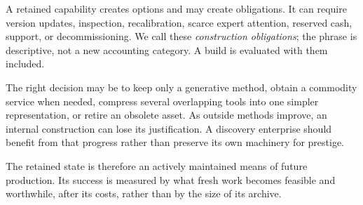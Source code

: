 A retained capability creates options and may create obligations. It can require version updates, inspection, recalibration, scarce expert attention, reserved cash, support, or decommissioning. We call these \emph{construction obligations}; the phrase is descriptive, not a new accounting category. A build is evaluated with them included.

The right decision may be to keep only a generative method, obtain a commodity service when needed, compress several overlapping tools into one simpler representation, or retire an obsolete asset. As outside methods improve, an internal construction can lose its justification. A discovery enterprise should benefit from that progress rather than preserve its own machinery for prestige.

The retained state is therefore an actively maintained means of future production. Its success is measured by what fresh work becomes feasible and worthwhile, after its costs, rather than by the size of its archive.

